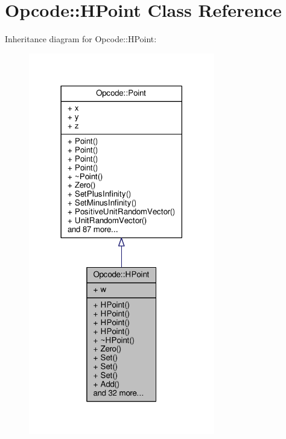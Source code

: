 \hypertarget{classOpcode_1_1HPoint}{}\section{Opcode\+:\+:H\+Point Class Reference}
\label{classOpcode_1_1HPoint}


Inheritance diagram for Opcode\+:\+:H\+Point\+:
\nopagebreak
\begin{figure}[H]
\begin{center}
\leavevmode
\includegraphics[width=230pt]{d7/dc5/classOpcode_1_1HPoint__inherit__graph}
\end{center}
\end{figure}


